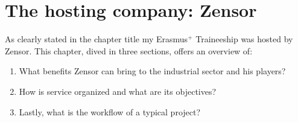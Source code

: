 \chapter{The hosting company: Zensor}\label{chapter:zensor}

As clearly stated in the chapter title my Erasmus$^{+}$ Traineeship was hosted by Zensor. 
This chapter, dived in three sections, offers an overview of:
\begin{enumerate}
    \item What benefits Zensor can bring to the industrial sector and his players?
    \item How is service organized and what are its objectives?
    \item Lastly, what is the workflow of a typical project?
\end{enumerate}




